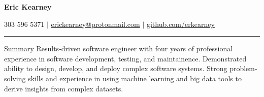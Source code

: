 \documentclass[12pt]{resumeclass}
\begin{document}
\centerline{\textbf{\LARGE{Eric Kearney}}}
\vspace{2pt}
\centerline{303 596 5371 $|$
\href{mailto:erickearney@protonmail.com}{erickearney@protonmail.com} $|$
\href{https://github.com/erkearney}{github.com/erkearney}}
\vspace{2pt}
\rule{\textwidth}{0.4pt}
\vspace{0.5pt}

\resumesect
    {Summary}
    {Results-driven software engineer with four years of professional experience
    in software development, testing, and maintainence. Demonstrated ability to
    design, develop, and deploy complex software systems. Strong problem-solving
    skills and experience in using machine learning and big data tools to derive
    insights from complex datasets.}
\vspace{1pt}
\end{document}
